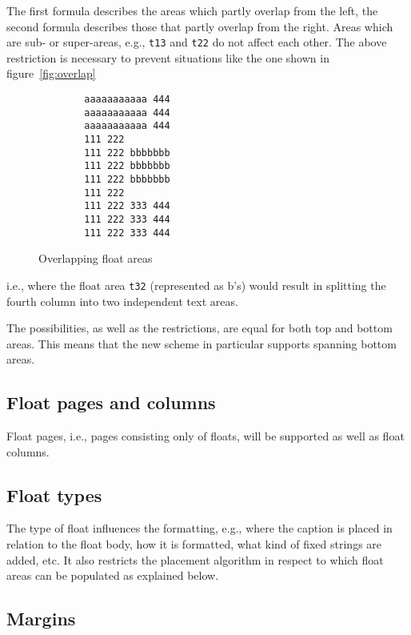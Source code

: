 \documentclass[twocolumn]{article}
\begin{document}
The first formula describes the areas which partly overlap from the
left, the second formula describes those that partly overlap from
the right. Areas which are sub- or super-areas, e.g., \texttt{t13}
and \texttt{t22} do not affect each other. The above restriction is
necessary to prevent situations like the one shown in
figure~\vref{fig:overlap}
%
\begin{figure}
\footnotesize
\caption{Overlapping float areas}\label{fig:overlap}
\begin{minipage}{.6\columnwidth}
\begin{verbatim}
        aaaaaaaaaaa 444
        aaaaaaaaaaa 444
        aaaaaaaaaaa 444
        111 222
        111 222 bbbbbbb
        111 222 bbbbbbb
        111 222 bbbbbbb
        111 222
        111 222 333 444
        111 222 333 444
        111 222 333 444
\end{verbatim}
\end{minipage}
\end{figure}
%
i.e., where the float area \texttt{t32} (represented as b's) would
result in splitting the fourth column into two independent text areas.


The possibilities, as well as the restrictions, are equal for both top
and bottom areas. This means that the new scheme in particular
supports spanning bottom areas.

\ORspecial\ShowGridfalse

\subsection{Float pages and columns}

Float pages, i.e., pages consisting only of floats, will be supported
as well as float columns.


\subsection{Float types}

The type of float influences the formatting, e.g., where the caption
is placed in relation to the float body, how it is formatted, what
kind of fixed strings are added, etc. It also restricts the placement
algorithm in respect to which float areas can be populated as
explained below.


\subsection{Margins}
\end{document}
